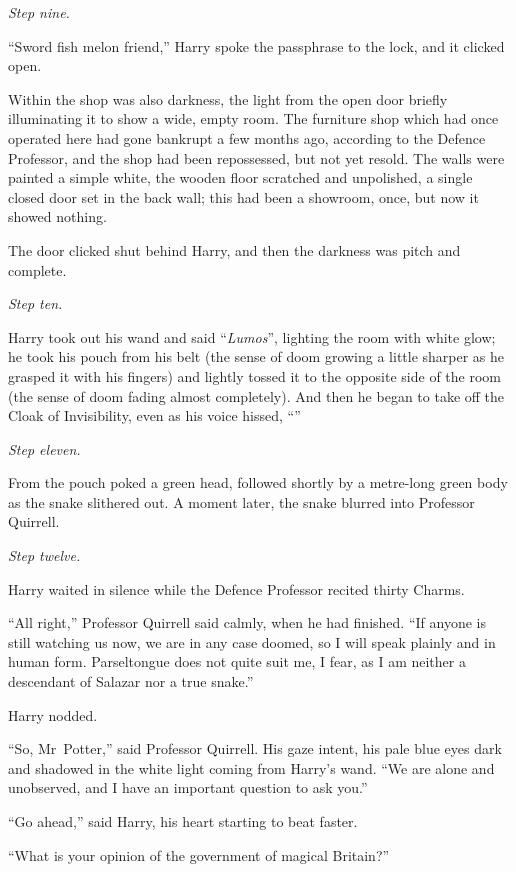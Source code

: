 \emph{Step nine.}

“Sword fish melon friend,” Harry spoke the passphrase to the lock, and it clicked open.

Within the shop was also darkness, the light from the open door briefly illuminating it to show a wide, empty room. The furniture shop which had once operated here had gone bankrupt a few months ago, according to the Defence Professor, and the shop had been repossessed, but not yet resold. The walls were painted a simple white, the wooden floor scratched and unpolished, a single closed door set in the back wall; this had been a showroom, once, but now it showed nothing.

The door clicked shut behind Harry, and then the darkness was pitch and complete.

\emph{Step ten.}

Harry took out his wand and said “\emph{Lumos}”, lighting the room with white glow; he took his pouch from his belt (the sense of doom growing a little sharper as he grasped it with his fingers) and lightly tossed it to the opposite side of the room (the sense of doom fading almost completely). And then he began to take off the Cloak of Invisibility, even as his voice hissed, “”

\emph{Step eleven.}

From the pouch poked a green head, followed shortly by a metre-long green body as the snake slithered out. A moment later, the snake blurred into Professor Quirrell.

\emph{Step twelve.}

Harry waited in silence while the Defence Professor recited thirty Charms.

“All right,” Professor Quirrell said calmly, when he had finished. “If anyone is still watching us now, we are in any case doomed, so I will speak plainly and in human form. Parseltongue does not quite suit me, I fear, as I am neither a descendant of Salazar nor a true snake.”

Harry nodded.

“So, Mr~Potter,” said Professor Quirrell. His gaze intent, his pale blue eyes dark and shadowed in the white light coming from Harry’s wand. “We are alone and unobserved, and I have an important question to ask you.”

“Go ahead,” said Harry, his heart starting to beat faster.

“What is your opinion of the government of magical Britain?”

